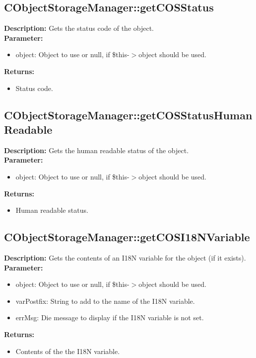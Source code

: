 \subsection{CObjectStorageManager::getCOSStatus}
\textbf{Description:} Gets the status code of the object.\\
\textbf{Parameter:}
\begin{itemize}
\item object: Object to use or null, if \$this-$>$object should be used.
\end{itemize}
\textbf{Returns:}
\begin{itemize}
\item Status code.
\end{itemize}

\subsection{CObjectStorageManager::getCOSStatusHumanReadable}
\textbf{Description:} Gets the human readable status of the object.\\
\textbf{Parameter:}
\begin{itemize}
\item object: Object to use or null, if \$this-$>$object should be used.
\end{itemize}
\textbf{Returns:}
\begin{itemize}
\item Human readable status.
\end{itemize}

\subsection{CObjectStorageManager::getCOSI18NVariable}
\textbf{Description:} Gets the contents of an I18N variable for the object (if it exists).\\
\textbf{Parameter:}
\begin{itemize}
\item object: Object to use or null, if \$this-$>$object should be used.
\item varPostfix: String to add to the name of the I18N variable.
\item errMsg: Die message to display if the I18N variable is not set.
\end{itemize}
\textbf{Returns:}
\begin{itemize}
\item Contents of the the I18N variable.
\end{itemize}

